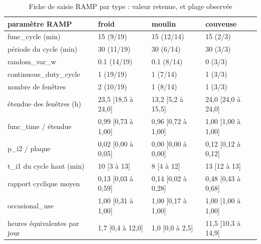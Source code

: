 \begin{table}[htbp]
\caption{Fiche de saisie RAMP par type : valeur retenue, et plage observée}
\label{tab:type_fiche}
\begin{tabular}{llll}
\toprule
paramètre RAMP & froid & moulin & couveuse \\
\midrule
func\_cycle (min) & 15 (9/19) & 15 (12/14) & 15 (2/3) \\
période du cycle (min) & 30 (11/19) & 30 (6/14) & 30 (3/3) \\
random\_var\_w & 0.1 (14/19) & 0.1 (8/14) & 0 (3/3) \\
continuous\_duty\_cycle & 1 (19/19) & 1 (7/14) & 1 (3/3) \\
nombre de fenêtres & 2 (10/19) & 1 (8/14) & 1 (3/3) \\
étendue des fenêtres (h) & 23,5  [18,5 à 24,0] & 13,2  [5,2 à 15,5] & 24,0  [24,0 à 24,0] \\
func\_time / étendue & 0,99  [0,73 à 1,00] & 0,96  [0,72 à 1,00] & 1,00  [1,00 à 1,00] \\
p\_i2 / plaque & 0,02  [0,00 à 0,05] & 0,00  [0,00 à 0,00] & 0,12  [0,12 à 0,12] \\
t\_i1 du cycle haut (min) & 10  [3 à 13] & 8  [4 à 12] & 13  [12 à 13] \\
rapport cyclique moyen & 0,13  [0,03 à 0,59] & 0,14  [0,02 à 0,28] & 0,48  [0,43 à 0,68] \\
occasional\_use & 1,00  [0,31 à 1,00] & 1,00  [0,17 à 1,00] & 1,00  [1,00 à 1,00] \\
heures équivalentes par jour & 1,7  [0,4 à 12,0] & 1,0  [0,0 à 2,5] & 11,5  [10,3 à 14,9] \\
\bottomrule
\end{tabular}
\end{table}
